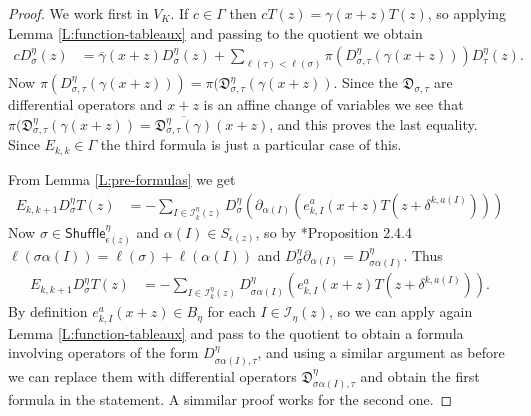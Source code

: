 \documentclass[11pt,fleqn]{article}
\newcommand\DD{\mathfrak D}
\newcommand\I{\mathcal I}
\newcommand\Shuffle{\mathsf{Shuffle}}
\begin{document}
\begin{proof}
We work first in $V_K$. If $c \in \Gamma$ then $c T(z) = \gamma(x+z) T(z)$, so
applying Lemma \ref{L:function-tableaux} and passing to the quotient we obtain
\begin{align*}
c D_\sigma^\eta(z)
	&= \overline \gamma(x+z) D_\sigma^\eta(z) +
		\sum_{\ell(\tau) < \ell(\sigma)} 
			\pi(D_{\sigma, \tau}^\eta(\gamma(x+z))) 
			D_\tau^\eta(z).
\end{align*}
Now $\pi(D_{\sigma, \tau}^\eta(\gamma(x+z))) = \pi(\DD_{\sigma,\tau}^\eta(
\gamma(x+z))$. Since the $\DD_{\sigma,\tau}$ are differential operators and
$x+z$ is an affine change of variables we see that $\pi(\DD_{\sigma,\tau}^\eta
(\gamma(x+z)) = \overline{\DD_{\sigma,\tau}^\eta(\gamma)}(x+z)$, and this 
proves the last equality. Since $E_{k,k} \in \Gamma$ the third formula is just 
a particular case of this.

From Lemma \ref{L:pre-formulas} we get
\begin{align*}
E_{k,k+1} D_\sigma^\eta T(z)
	&= - \sum_{I \in \I_k^\eta(z)} D_\sigma^\eta (\partial_{\alpha(I)} 
		\left(
			e_{k,I}^a(x+z) T(z + \delta^{k,a(I)})
		\right))
\end{align*}
Now $\sigma \in \Shuffle_{\epsilon(z)}^\eta$ and $\alpha(I) \in 
S_{\epsilon(z)}$, so by \cite{BB-coxeter-book}*{Proposition 2.4.4}
$\ell(\sigma \alpha(I)) = \ell(\sigma) + \ell(\alpha(I))$ and
$D_\sigma^\eta \partial_{\alpha(I)} = D^\eta_{\sigma \alpha(I)}$. Thus
\begin{align*}
E_{k,k+1} D_\sigma^\eta T(z)
	&= - \sum_{I \in \I_k^\eta(z)} D_{\sigma\alpha(I)}^\eta  
		\left(
			e_{k,I}^a(x+z) T(z + \delta^{k,a(I)})
		\right).
\end{align*}
By definition $e_{k,I}^a(x+z) \in B_\eta$ for each $I \in \I_\eta(z)$, so
we can apply again Lemma \ref{L:function-tableaux} and pass to the quotient
to obtain a formula involving operators of the form $D_{\sigma\alpha(I), 
\tau}^\eta$, and using a similar argument as before we can replace them with
differential operators $\DD_{\sigma\alpha(I), \tau}^\eta$ and obtain the 
first formula in the statement. A simmilar proof works for the second one.
\end{proof}

\begin{bibdiv}
\begin{biblist}
\end{biblist}
\end{bibdiv}
\end{document}
